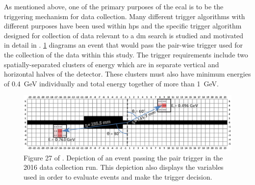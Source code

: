As mentioned above, one of the primary purposes of the \ac{ecal} is to be the triggering mechanism
for data collection. Many different trigger algorithms with different purposes have been used within
\ac{hps} and the specific trigger algorithm designed for collection of data relevant to a \ac{dm}
search is studied and motivated in detail in \cite{skmccarty-thesis-2020}.
\cref{fig:hps-pair-trigger-depiction} diagrams an event that would pass the pair-wise trigger
used for the collection of the data within this study.
The trigger requirements include two spatially-separated clusters of energy which are in
separate vertical and horizontal halves of the detector.
These clusters must also have minimum energies of \qty{0.4}{\giga\electronvolt} individually
and total energy together of more than \qty{1}{\giga\electronvolt}.

\begin{figure}
	\centering
	\includegraphics[width=\textwidth]{figures/hps/experiment/smckarty-thesis-fig-27-pair-trigger-depiction.png}
	\caption{
		Figure 27 of \cite{skmccarty-thesis-2020}. Depiction of an event passing the pair trigger
		in the 2016 data collection run. This depiction also displays the variables used in order
		to evaluate events and make the trigger decision.
	}
	\label{fig:hps-pair-trigger-depiction}
\end{figure}